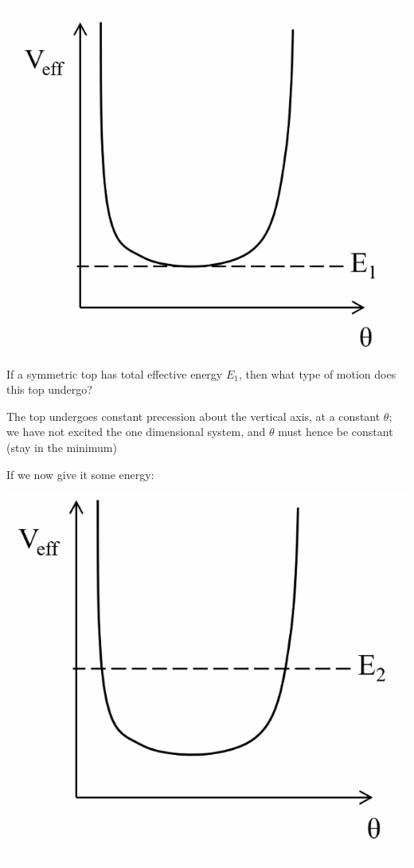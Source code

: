 \documentclass[../PHYS306Notes.tex]{subfiles}
\begin{document}
\begin{center}
    \includegraphics[scale=0.5]{Lecture-22/l22-img2.png}
\end{center}
If a symmetric top has total effective energy $E_1$, then what type of motion does this top undergo?
\begin{s}
The top undergoes constant precession about the vertical axis, at a constant $\theta$; we have not excited the one dimensional system, and $\theta$ must hence be constant (stay in the minimum)
\end{s}
If we now give it some energy:
\begin{center}
    \includegraphics[scale=0.5]{Lecture-22/l22-img3.png}
\end{center}
\end{document}
